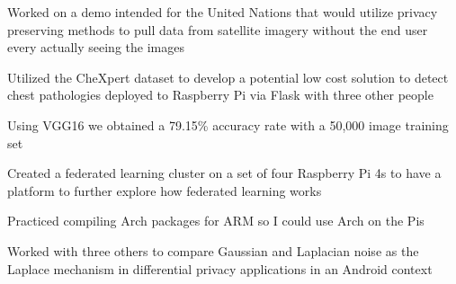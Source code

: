 \documentclass[letterpaper]{resume}
\begin{document}
\begin{compactitem}
\item Worked on a demo intended for the United Nations that would utilize privacy preserving methods to pull data from satellite imagery without the end user every actually seeing the images
\end{compactitem}

\begin{compactitem}
\item Utilized the CheXpert dataset to develop a potential low cost solution to detect chest pathologies deployed to Raspberry Pi via Flask with three other people
\item Using VGG16 we obtained a 79.15\% accuracy rate with a 50,000 image training set
\end{compactitem}


\begin{compactitem}
\item Created a federated learning cluster on a set of four Raspberry Pi 4s to have a platform to further explore how federated learning works
\item Practiced compiling Arch packages for ARM so I could use Arch on the Pis
\end{compactitem}

\begin{compactitem}
\item Worked with three others to compare Gaussian and Laplacian noise as the Laplace mechanism in differential privacy applications in an Android context
\end{compactitem}

\end{document}
